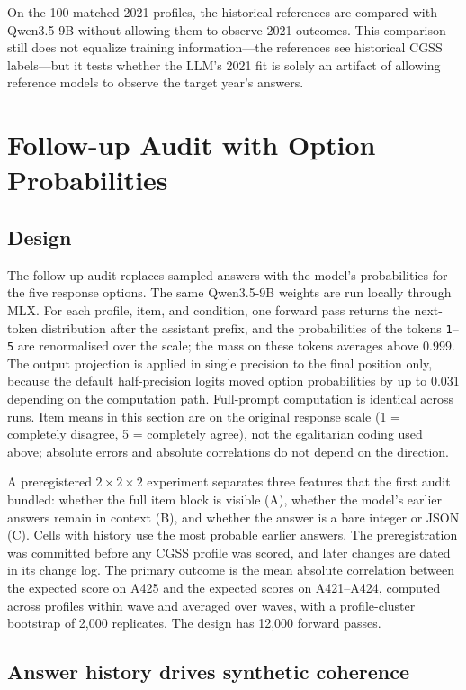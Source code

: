 \documentclass[11pt]{article}
\begin{document}
On the 100 matched 2021 profiles, the historical references are compared with Qwen3.5-9B without allowing them to observe 2021 outcomes. This comparison still does not equalize training information---the references see historical CGSS labels---but it tests whether the LLM's 2021 fit is solely an artifact of allowing reference models to observe the target year's answers.

\section{Follow-up Audit with Option Probabilities}
\label{sec:v2}

\subsection{Design}

The follow-up audit replaces sampled answers with the model's probabilities for the five response options. The same Qwen3.5-9B weights are run locally through MLX. For each profile, item, and condition, one forward pass returns the next-token distribution after the assistant prefix, and the probabilities of the tokens \texttt{1}--\texttt{5} are renormalised over the scale; the mass on these tokens averages above 0.999. The output projection is applied in single precision to the final position only, because the default half-precision logits moved option probabilities by up to 0.031 depending on the computation path. Full-prompt computation is identical across runs. Item means in this section are on the original response scale (1 = completely disagree, 5 = completely agree), not the egalitarian coding used above; absolute errors and absolute correlations do not depend on the direction.

A preregistered $2\times2\times2$ experiment separates three features that the first audit bundled: whether the full item block is visible (A), whether the model's earlier answers remain in context (B), and whether the answer is a bare integer or JSON (C). Cells with history use the most probable earlier answers. The preregistration was committed before any CGSS profile was scored, and later changes are dated in its change log. The primary outcome is the mean absolute correlation between the expected score on A425 and the expected scores on A421--A424, computed across profiles within wave and averaged over waves, with a profile-cluster bootstrap of 2,000 replicates. The design has 12,000 forward passes.

\subsection{Answer history drives synthetic coherence}
\end{document}
